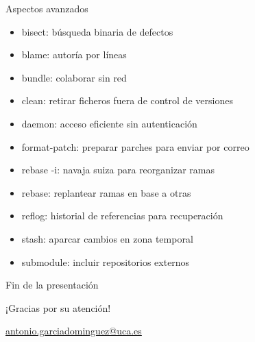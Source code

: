 \documentclass[xcolor=svgnames]{beamer}
\newcommand*{\inlinecmd}[1]{{\small\ttfamily\nohyphens{#1}}}
\begin{document}
\appendix

\begin{frame}{Aspectos avanzados}
  \begin{itemize}
  \item \inlinecmd{bisect}: búsqueda binaria de defectos
  \item \inlinecmd{blame}: autoría por líneas
  \item \inlinecmd{bundle}: colaborar sin red
  \item \inlinecmd{clean}: retirar ficheros fuera de control de versiones
  \item \inlinecmd{daemon}: acceso eficiente sin autenticación
  \item \inlinecmd{format-patch}: preparar parches para enviar por correo
  \item \inlinecmd{rebase -i}: navaja suiza para reorganizar ramas
  \item \inlinecmd{rebase}: replantear ramas en base a otras
  \item \inlinecmd{reflog}: historial de referencias para recuperación
  \item \inlinecmd{stash}: aparcar cambios en zona temporal
  \item \inlinecmd{submodule}: incluir repositorios externos
  \end{itemize}
\end{frame}

\begin{frame}{Fin de la presentación}
  \begin{center}
    {\Huge ¡Gracias por su atención!}

    \vspace{3em}

    {\Large
      \href{mailto:antonio.garciadominguez@uca.es}{antonio.garciadominguez@uca.es}}
  \end{center}
\end{frame}
\end{document}
